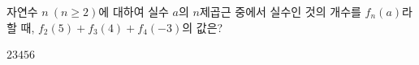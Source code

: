 자연수 $n\ (n\ge 2)$에 대하여 실수 $a$의 $n$제곱근 중에서 실수인 것의 개수를 $f_n(a)$라 할 때, $f_2(5)+f_3(4)+f_4(-3)$의 값은?
\begin{choices32}{$2$}{$3$}{$4$}{$5$}{$6$}\end{choices32}
